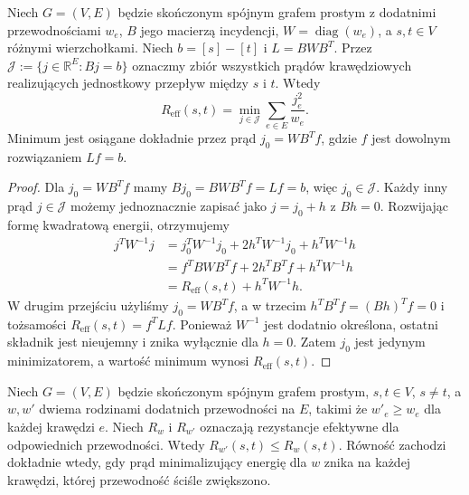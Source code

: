 \begin{twierdzenie}
Niech $G=(V,E)$ będzie skończonym spójnym grafem
prostym z dodatnimi przewodnościami $w_e$, $B$ jego
macierzą incydencji, $W=\operatorname{diag}(w_e)$,
a $s,t\in V$ różnymi wierzchołkami. Niech $b=[s]-[t]$
i $L=BWB^T$. Przez
$\mathcal J:=\{j\in\mathbb R^E:Bj=b\}$ oznaczmy
zbiór wszystkich prądów krawędziowych realizujących
jednostkowy przepływ między $s$ i $t$.
Wtedy
\[
R_{\mathrm{eff}}(s,t)
=\min_{j\in\mathcal J}\sum_{e\in E}\frac{j_e^2}{w_e}.
\]
Minimum jest osiągane dokładnie przez prąd
$j_0=WB^Tf$, gdzie $f$ jest dowolnym rozwiązaniem $Lf=b$.
\end{twierdzenie}

\begin{proof}
Dla $j_0=WB^Tf$ mamy
$Bj_0=BWB^Tf=Lf=b$, więc $j_0\in\mathcal J$.
Każdy inny prąd $j\in\mathcal J$ możemy jednoznacznie
zapisać jako $j=j_0+h$ z $Bh=0$.
Rozwijając formę kwadratową energii,
otrzymujemy
\[
\begin{aligned}
 j^TW^{-1}j
 &=j_0^TW^{-1}j_0+2h^TW^{-1}j_0+h^TW^{-1}h\\
 &=f^TBWB^Tf+2h^TB^Tf+h^TW^{-1}h\\
 &=R_{\mathrm{eff}}(s,t)+h^TW^{-1}h.
\end{aligned}
\]
W drugim przejściu użyliśmy $j_0=WB^Tf$,
a w trzecim $h^TB^Tf=(Bh)^Tf=0$ i tożsamości
$R_{\mathrm{eff}}(s,t)=f^TLf$.
Ponieważ $W^{-1}$ jest dodatnio określona,
ostatni składnik jest nieujemny i znika wyłącznie
dla $h=0$. Zatem $j_0$ jest jedynym minimizatorem,
a wartość minimum wynosi $R_{\mathrm{eff}}(s,t)$.
\end{proof}

\begin{twierdzenie}
\label{thm:tg-resistance-rayleigh}
Niech $G=(V,E)$ będzie skończonym spójnym grafem
prostym, $s,t\in V$, $s\ne t$, a $w,w'$ dwiema
rodzinami dodatnich przewodności na $E$, takimi że
$w'_e\ge w_e$ dla każdej krawędzi $e$.
Niech $R_w$ i $R_{w'}$ oznaczają rezystancje
efektywne dla odpowiednich przewodności.
Wtedy $R_{w'}(s,t)\le R_w(s,t)$.
Równość zachodzi dokładnie wtedy, gdy prąd minimalizujący
energię dla $w$ znika na każdej krawędzi, której
przewodność ściśle zwiększono.
\end{twierdzenie}

